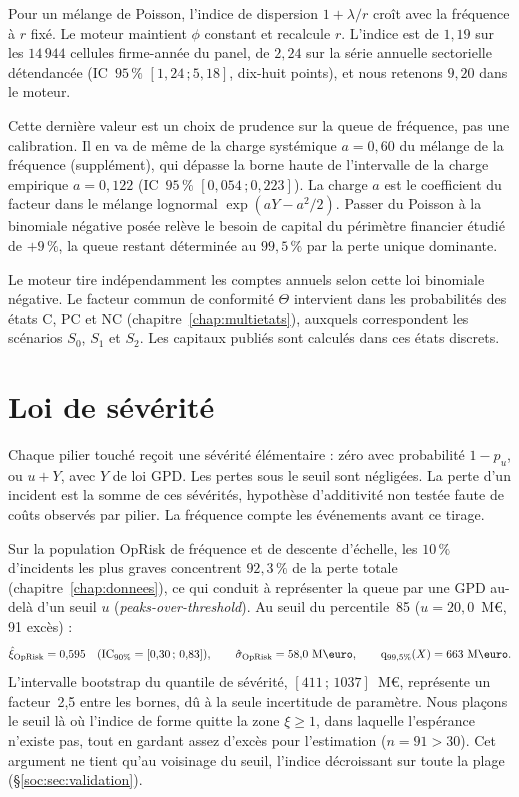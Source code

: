 Pour un mélange de Poisson, l'indice de dispersion $1+\lambda/r$ croît avec la fréquence à $r$ fixé.
Le moteur maintient $\phi$ constant et recalcule $r$. L'indice est de $1{,}19$ sur les $14\,944$ cellules firme-année du
panel, de $2{,}24$ sur la série annuelle sectorielle détendancée (IC~$95\,\%$ $[1{,}24\,;5{,}18]$,
dix-huit points), et nous retenons $9{,}20$ dans le moteur.

Cette dernière valeur est un choix de prudence sur la queue de fréquence, pas une calibration. Il
en va de même de la charge systémique $a=0{,}60$ du mélange de la fréquence (supplément), qui dépasse la
borne haute de l'intervalle de la charge empirique $a=0{,}122$ (IC~$95\,\%$ $[0{,}054\,;0{,}223]$).
La charge $a$ est le coefficient du facteur dans le mélange lognormal $\exp(aY-a^2/2)$. Passer du Poisson à la
binomiale négative posée relève le besoin de capital du périmètre financier étudié de $+9\,\%$, la queue
restant déterminée au $99{,}5\,\%$ par la perte unique dominante.

Le moteur tire indépendamment les comptes annuels selon cette loi binomiale négative.
Le facteur commun de conformité $\Theta$ intervient dans les probabilités des états C, PC et NC
(chapitre~\ref{chap:multietats}), auxquels correspondent les scénarios $S_0$, $S_1$ et $S_2$.
Les capitaux publiés sont calculés dans ces états discrets.

\section{Loi de sévérité}
\label{soc:sec:severite}

Chaque pilier touché reçoit une sévérité élémentaire : zéro avec probabilité $1-p_u$, ou $u+Y$, avec $Y$ de loi GPD.
Les pertes sous le seuil sont négligées. La perte d'un incident est la somme de ces sévérités,
hypothèse d'additivité non testée faute de coûts observés par pilier. La fréquence compte les événements avant ce tirage.


Sur la population OpRisk de fréquence et de descente d'échelle, les $10\,\%$ d'incidents les plus graves concentrent $92{,}3\,\%$ de la perte totale
(chapitre~\ref{chap:donnees}), ce qui conduit à représenter la queue par une GPD au-delà d'un seuil $u$
(\emph{peaks-over-threshold}). Au seuil du percentile~85 ($u = 20{,}0$~M\euro, 91 excès) :
\begin{equation}
\hat{\xi}_{\text{OpRisk}} = 0{,}595 \quad (\text{IC}_{90\%}=[0{,}30\,;\,0{,}83]),
\qquad
\hat{\sigma}_{\text{OpRisk}} = 58{,}0~\text{M\euro},
\qquad
\qsev_{99{,}5\%}(X) = 663~\text{M\euro}.
\end{equation}
L'intervalle bootstrap du quantile de sévérité, $[411\,;\,1037]$~M\euro, représente un facteur~2{,}5
entre les bornes, dû à la seule incertitude de paramètre. Nous plaçons le seuil là où l'indice de
forme quitte la zone $\xi \geq 1$, dans laquelle l'espérance n'existe pas, tout en gardant assez
d'excès pour l'estimation ($n = 91 > 30$). Cet argument ne tient qu'au voisinage du seuil, l'indice
décroissant sur toute la plage (\S\ref{soc:sec:validation}).

